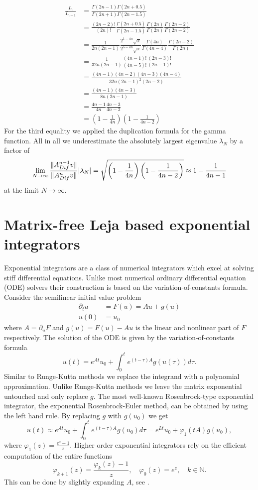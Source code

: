 \documentclass{scrartcl}
\begin{document}
\begin{align*}
\frac{I_n}{I_{n-1}} &= 
\frac{\Gamma(2n - 1)\Gamma(2n + 0.5)}{\Gamma(2n + 1)\Gamma(2n - 1.5)} \\&=   
\frac{(2n - 2)!}{(2n)!}
\frac{\Gamma(2n + 0.5)}{\Gamma(2n - 1.5)}
\frac{\Gamma(2n)}{\Gamma(2n)}
\frac{\Gamma(2n-2)}{\Gamma(2n-2)} \\&=
\frac{1}{2n(2n-1)} 
\frac{2^{1-4n}\sqrt\pi}{2^{5-4n}\sqrt\pi}
\frac{\Gamma(4n)}{\Gamma(4n-4)}
\frac{\Gamma(2n-2)}{\Gamma(2n)} \\&=
\frac{1}{32n(2n-1)} 
\frac{(4n-1)!}{(4n-5)!}
\frac{(2n-3)!}{(2n-1)!} \\&=
\frac{(4n-1)(4n-2)(4n-3)(4n-4)}{32n(2n-1)^2(2n-2)} \\&=
\frac{(4n-1)(4n-3)}{8n(2n-1)} \\&=
\frac{4n-1}{4n}\frac{4n-3}{4n-2} \\&=
\left(1-\frac{1}{4n}\right)\left(1-\frac{1}{4n-2}\right)
\end{align*}
For the third equality we applied the duplication formula for the gamma function. All in all we underestimate the absolutely largest eigenvalue $\lambda_N$ by a factor of 
\[
\lim_{N\to\infty}\frac{\lVert A_{Dif}^{n-1}v\rVert}{\lVert A_{Dif}^{n}v\rVert}\lvert\lambda_N\rvert =
\sqrt{\left(1-\frac{1}{4n}\right)\left(1-\frac{1}{4n-2}\right)} \approx
1-\frac{1}{4n-1}
\]
at the limit $N\to\infty$. 

\section{Matrix-free Leja based exponential integrators}
Exponential integrators are a class of numerical integrators which excel at solving stiff differential equations. Unlike most numerical ordinary differential equation (ODE) solvers their construction is based on the variation-of-constants formula. Consider the semilinear initial value problem
\begin{align*}
	\partial_tu &= F(u) = Au + g(u) \\ 
	u(0) &= u_0
\end{align*}
where $A = \partial_uF$ and $g(u) = F(u)-Au$ is the linear and nonlinear part of $F$ respectively. The solution of the ODE is given by the variation-of-constants formula
\[
u(t) = e^{At}u_0 + \int_{0}^{t}e^{(t-\tau)A}g(u(\tau))d\tau.
\]
Similar to Runge-Kutta methods we replace the integrand with a polynomial approximation. Unlike Runge-Kutta methods we leave the matrix exponential untouched and only replace $g$. The most well-known Rosenbrock-type exponential integrator, the exponential Rosenbrock-Euler method, can be obtained by using the left hand rule. By replacing $g$ with $g(u_0)$ we get
\[
u(t) \approx e^{At}u_0 + \int_{0}^{t}e^{(t-\tau)A}g(u_0)d\tau = e^{Lt}u_0 + \varphi_1(tA)g(u_0),
\]
where $\varphi_1(z) = \frac{e^z-1}z$. Higher order exponential integrators rely on the efficient computation of the entire functions 
\[\varphi_{k+1}(z) = \frac{\varphi_k(z)-1}z, \quad \varphi_0(z) = e^z, \quad k\in\mathbb{N}.\]
This can be done by slightly expanding $A$, see \cite[Theorem 2.1]{action}.
\end{document}
